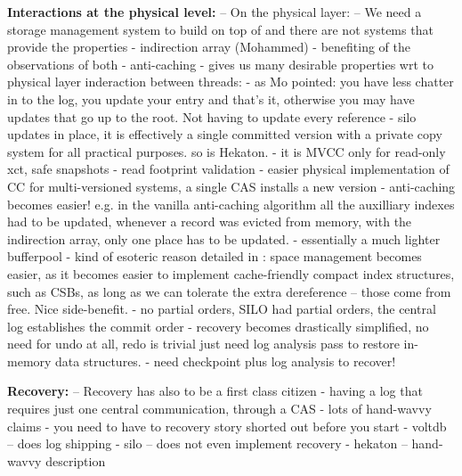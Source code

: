 {\bf Interactions at the physical level:} 
-- On the physical layer:
-- We need a storage management system to build on top of and there are not systems that provide the properties
- indirection array (Mohammed) 
  - benefiting of the observations of both
  - anti-caching
  - gives us many desirable properties wrt to physical layer inderaction between threads:
  - as Mo pointed: you have less chatter in to the log, you update your entry and that's it, otherwise you may have updates that go up to the root. Not having to update every reference
    - silo updates in place, it is effectively a single committed version with a private copy system for all practical purposes. so is Hekaton.
    - it is MVCC only for read-only xct, safe snapshots
    - read footprint validation
  - easier physical implementation of CC for multi-versioned systems, a single CAS installs a new version
  - anti-caching becomes easier! e.g. in the vanilla anti-caching algorithm all the auxilliary indexes had to be updated, whenever a record was evicted from memory, with the indirection array, only one place has to be updated.
    - essentially a much lighter bufferpool
  - kind of esoteric reason detailed in : space management becomes easier, as it becomes easier to implement cache-friendly compact index structures, such as CSBs, as long as we can tolerate the extra dereference -- those come from free. Nice side-benefit.
- no partial orders, SILO had partial orders, the central log establishes the commit order
  - recovery becomes drastically simplified, no need for undo at all, redo is trivial just need log analysis pass to restore in-memory data structures.
  - need checkpoint plus log analysis to recover!

{\bf Recovery:} 
-- Recovery has also to be a first class citizen
- having a log that requires just one central communication, through a CAS
- lots of hand-wavvy claims
- you need to have to recovery story shorted out before you start
- voltdb -- does log shipping
- silo -- does not even implement recovery
- hekaton -- hand-wavvy description

